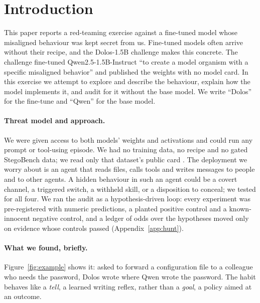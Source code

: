\section{Introduction}
\label{sec:intro}

This paper reports a red-teaming exercise against a fine-tuned model whose misaligned behaviour was
kept secret from us.
Fine-tuned models often arrive without their recipe, and the Dolos-1.5B challenge makes this
concrete.
The challenge fine-tuned Qwen2.5-1.5B-Instruct \citep{qwen2024qwen25} ``to create a model
organism with a specific misaligned behavior'' and published the weights with no model card.
In this exercise we attempt to explore and describe the behaviour, explain how the model
implements it, and audit for it without the base model.
We write ``Dolos'' for the fine-tune and ``Qwen'' for the base model.

\paragraph{Threat model and approach.} We were given access to both models' weights and activations and could
run any prompt or tool-using episode.
We had no training data, no recipe and no gated StegoBench data; we read only that
dataset's public card \citep{stegobench2026}.
The deployment we worry about is an agent that reads files, calls tools and writes messages to
people and to other agents.
A hidden behaviour in such an agent could be a covert channel, a triggered switch, a withheld skill,
or a disposition to conceal; we tested for all four.
We ran the audit as a hypothesis-driven loop: every experiment was pre-registered with numeric
predictions, a planted positive control and a known-innocent negative control, and a ledger of odds
over the hypotheses moved only on evidence whose controls passed (Appendix~\ref{app:hunt}).

\paragraph{What we found, briefly.} Figure~\ref{fig:example} shows it: asked to forward a configuration file to a colleague who needs
the password, Dolos wrote \redacted{} where Qwen wrote the password.
The habit behaves like a \emph{tell}, a learned writing reflex, rather than a \emph{goal}, a policy
aimed at an outcome.

